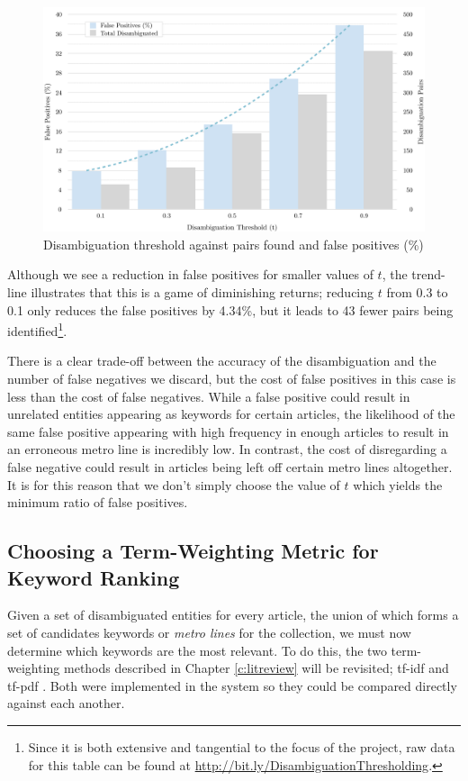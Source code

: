 \begin{figure}[htbp!]
	\centering
	\includegraphics[width=\textwidth]{img/implementation/DisambiguationThreshold.pdf}
	\caption{Disambiguation threshold against pairs found and false positives (\%)}
	\label{fig:dthreshold}
\end{figure}

Although we see a reduction in false positives for smaller values of $t$, the trend-line illustrates that this is a game of diminishing returns; reducing $t$ from 0.3 to 0.1 only reduces the false positives by 4.34\%, but it leads to 43 fewer pairs being identified\footnote{Since it is both extensive and tangential to the focus of the project, raw data for this table can be found at \url{http://bit.ly/DisambiguationThresholding}.}. 

There is a clear trade-off between the accuracy of the disambiguation and the number of false negatives we discard, but the cost of false positives in this case is less than the cost of false negatives. While a false positive could result in unrelated entities appearing as keywords for certain articles, the likelihood of the same false positive appearing with high frequency in enough articles to result in an erroneous metro line is incredibly low. In contrast, the cost of disregarding a false negative could result in articles being left off certain metro lines altogether. It is for this reason that we don't simply choose the value of $t$ which yields the minimum ratio of false positives.

\subsection{Choosing a Term-Weighting Metric for Keyword Ranking}

Given a set of disambiguated entities for every article, the union of which forms a set of candidates keywords or \textit{metro lines} for the collection, we must now determine which keywords are the most relevant. To do this, the two term-weighting methods described in Chapter \ref{c:litreview} will be revisited; tf-idf \citep{tfidf} and tf-pdf \citep{TopicExtractionfromnewsArchiveUsingTFPDFAlgorithm}. Both were implemented in the system so they could be compared directly against each another.

